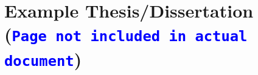 \documentclass{./LaTeX/tex/latex/MastersDoctoralThesis}
\begin{document}
    
    \frontMatter
    
    \part*{Example Thesis/Dissertation \\{\large(\textcolor{blue}{\texttt{Page
    not included in actual document}})}} %
    
    
    \begin{center}
        \thesisTitle
        \copyrightpage
        \dissertationapproval
    \end{center}
    
    
    \abstractPage
    
    
    \dedicationPage
    
    
    \frontispiecePage
    
    
    \epigraphPage
    
    
\end{document}
